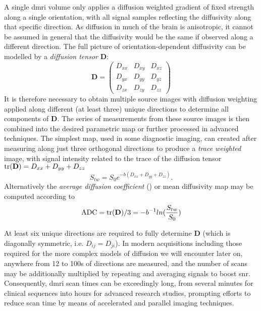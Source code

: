 A single \gls{dmri} volume only applies a diffusion weighted gradient of fixed strength along a single orientation, with all signal samples reflecting the diffusivity along that specific direction.
As diffusion in much of the brain is anisotropic, it cannot be assumed in general that the diffusivity would be the same if observed along a different direction.
The full picture of orientation-dependent diffusivity can be modelled by a \textit{diffusion tensor} $\mathbf{D}$:
\begin{equation}
  \mathbf{D} = \begin{pmatrix}
                D_{xx} & D_{xy} & D_{xz}\\
                D_{yx} & D_{yy} & D_{yz} \\
                D_{zx} & D_{zy} & D_{zz}
                \end{pmatrix}
\end{equation}
It is therefore necessary to obtain multiple source images with diffusion weighting applied along different (at least three) unique directions to determine all components of $\mathbf{D}$.
The series of measurements from these source images is then combined into the desired parametric map or further processed in advanced techniques.
The simplest map, used in some diagnostic imaging, can created after measuring along just three orthogonal directions to produce a \textit{trace weighted} image, with signal intensity related to the trace of the diffusion tensor $\text{tr(\textbf{D})} = D_{xx} + D_{yy} + D_{zz}$
\begin{equation}
  S_{tw} = S_0 e^{-b(D_{xx} + D_{yy} + D_{zz})}.
\end{equation}
Alternatively the \textit{average diffusion coefficient} () or mean diffusivity map may be computed according to
\begin{equation}
  \text{ADC} = \text{tr(\textbf{D})} / 3 = -b^{-1} ln (\frac{S_{tw}}{S_0})
\end{equation}

At least six unique directions are required to fully determine $\mathbf{D}$ (which is diagonally symmetric, i.e. $D_{ij} = D_{ji}$).
In modern acquisitions including those required for the more complex models of diffusion we will encounter later on, anywhere from 12 to 100s of directions are measured, and the number of scans may be additionally multiplied by repeating and averaging signals to boost \gls{snr}.
Consequently, \gls{dmri} scan times can be exceedingly long, from several minutes for clinical sequences into hours for advanced research studies, prompting efforts to reduce scan time by means of accelerated and parallel imaging techniques.

